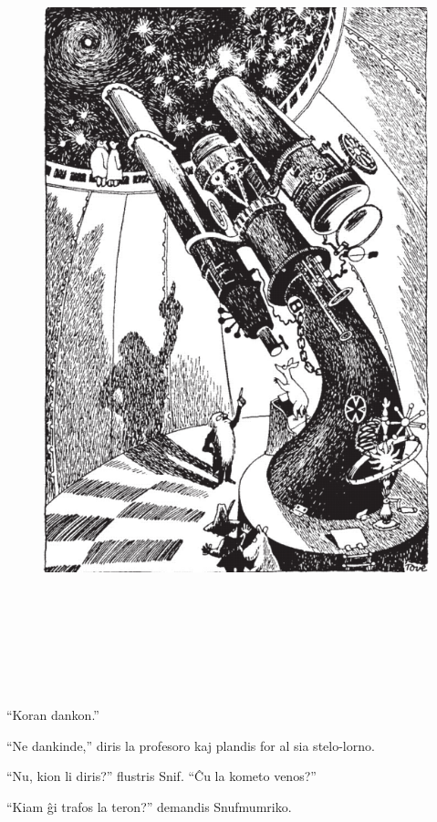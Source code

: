 \begin{figure}[htbp]
\centering
\includegraphics[width=450pt,height=658pt]{4-6.png}
\caption{}
\label{4-6}
\end{figure}

``Koran dankon.''

``Ne dankinde,'' diris la profesoro kaj plandis for al sia stelo-lorno.

``Nu, kion li diris?'' flustris Snif. ``Ĉu la kometo venos?''

``Kiam ĝi trafos la teron?'' demandis Snufmumriko.

